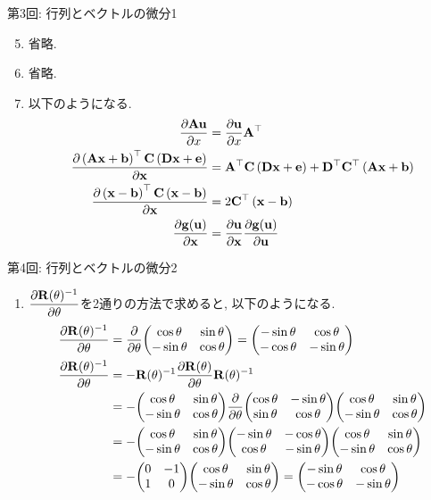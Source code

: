 \documentclass[dvipdfmx,notheorems,t]{beamer}
\begin{document}
\begin{frame}{第3回: 行列とベクトルの微分1}
\begin{enumerate}
  \setcounter{enumi}{4}
  \item 省略.
  \item 省略.
  \item 以下のようになる.
  \begin{align*}
    \pdv{\vb{A} \vb{u}}{x} &= \pdv{\vb{u}}{x} \vb{A}^\top \\
    \pdv{\left( \vb{A} \vb{x} + \vb{b} \right)^\top \vb{C} \left( \vb{D} \vb{x} + \vb{e} \right)}{\vb{x}}
      &= \vb{A}^\top \vb{C} \left( \vb{D} \vb{x} + \vb{e} \right)
        + \vb{D}^\top \vb{C}^\top \left( \vb{A} \vb{x} + \vb{b} \right) \\
    \pdv{\left( \vb{x} - \vb{b} \right)^\top \vb{C} \left( \vb{x} - \vb{b} \right)}{\vb{x}}
      &= 2 \vb{C}^\top \left( \vb{x} - \vb{b} \right) \\
    \pdv{\vb{g}(\vb{u})}{\vb{x}} &= \pdv{\vb{u}}{\vb{x}} \pdv{\vb{g}(\vb{u})}{\vb{u}}
  \end{align*}
\end{enumerate}
\end{frame}

\begin{frame}{第4回: 行列とベクトルの微分2}
\begin{enumerate}
  \item $\displaystyle \pdv{\vb{R}(\theta)^{-1}}{\theta}$を2通りの方法で求めると, 以下のようになる.
  \begin{align*}
    \pdv{\vb{R}(\theta)^{-1}}{\theta}
      &= \pdv{\theta} \mqty(\cos \theta & \sin \theta \\ -\sin \theta & \cos \theta)
      = \mqty(-\sin \theta & \cos \theta \\ -\cos \theta & -\sin \theta) \\
    \pdv{\vb{R}(\theta)^{-1}}{\theta}
      &= - \vb{R}(\theta)^{-1} \pdv{\vb{R}(\theta)}{\theta} \vb{R}(\theta)^{-1} \\
      &= - \mqty(\cos \theta & \sin \theta \\ -\sin \theta & \cos \theta)
        \pdv{\theta} \mqty(\cos \theta & -\sin \theta \\ \sin \theta & \cos \theta)
        \mqty(\cos \theta & \sin \theta \\ -\sin \theta & \cos \theta) \\
      &= - \mqty(\cos \theta & \sin \theta \\ -\sin \theta & \cos \theta)
        \mqty(-\sin \theta & -\cos \theta \\ \cos \theta & -\sin \theta)
        \mqty(\cos \theta & \sin \theta \\ -\sin \theta & \cos \theta) \\
      &= - \mqty(0 & -1 \\ 1 & 0) \mqty(\cos \theta & \sin \theta \\ -\sin \theta & \cos \theta)
      = \mqty(-\sin \theta & \cos \theta \\ -\cos \theta & -\sin \theta)
  \end{align*}
\end{enumerate}
\end{frame}
\end{document}
